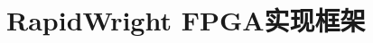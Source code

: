 \section{RapidWright FPGA实现框架}
                                                                                                                                                                                                                                                                                                                                                                                                                                                                                                                                                                                                                                                                                                                                                                                                                                                                                                                                                                                                                                                                                                                                                                                                                                                                                                                                                                                                                                                                                                                                                                                                                                                                                                                                                                                                                                                                                                                                                                                                                                                                                                                                                                                                                                                                                                                                                                                                                                                                                                                                                                                                                                                            
